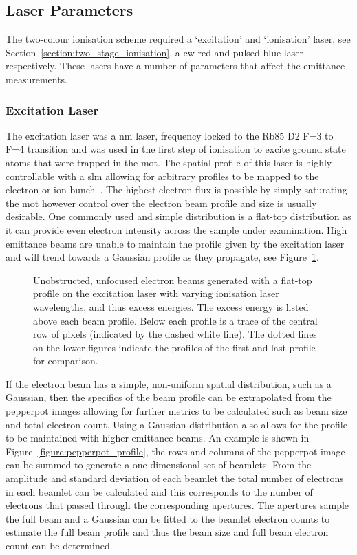 \subsection{Laser Parameters}
The two-colour ionisation scheme required a `excitation' and `ionisation' laser, see Section~\ref{section:two_stage_ionisation}, a \gls{cw} red and pulsed blue laser respectively.
These lasers have a number of parameters that affect the emittance measurements.

\subsubsection{Excitation Laser}
The excitation laser was a \unit[780]{nm} laser, frequency locked to the Rb85 D2 F=3 to F=4 transition and was used in the first step of ionisation to excite ground state atoms that were trapped in the \gls{mot}.
The spatial profile of this laser is highly controllable with a \gls{slm} allowing for arbitrary profiles to be mapped to the electron or ion bunch~\cite{mcculloch_arbitrarily_2011}.
The highest electron flux is possible by simply saturating the \gls{mot} however control over the electron beam profile and size is usually desirable.
One commonly used and simple distribution is a flat-top distribution as it can provide even electron intensity across the sample under examination.
High emittance beams are unable to maintain the profile given by the excitation laser and will trend towards a Gaussian profile as they propagate, see Figure~\ref{figure:flat_top}.

\begin{figure}
    \center
    
    \caption{Unobstructed, unfocused electron beams generated with a flat-top profile on the excitation laser with varying ionisation laser wavelengths, and thus excess energies. The excess energy is listed above each beam profile. Below each profile is a trace of the central row of pixels (indicated by the dashed white line). The dotted lines on the lower figures indicate the profiles of the first and last profile for comparison.}
    \label{figure:flat_top}
\end{figure}

If the electron beam has a simple, non-uniform spatial distribution, such as a Gaussian, then the specifics of the beam profile can be extrapolated from the pepperpot images allowing for further metrics to be calculated such as beam size and total electron count.
Using a Gaussian distribution also allows for the profile to be maintained with higher emittance beams.
An example is shown in Figure~\ref{figure:pepperpot_profile}, the rows and columns of the pepperpot image can be summed to generate a one-dimensional set of beamlets.
From the amplitude and standard deviation of each beamlet the total number of electrons in each beamlet can be calculated and this corresponds to the number of electrons that passed through the corresponding apertures.
The apertures sample the full beam and a Gaussian can be fitted to the beamlet electron counts to estimate the full beam profile and thus the beam size and full beam electron count can be determined.

